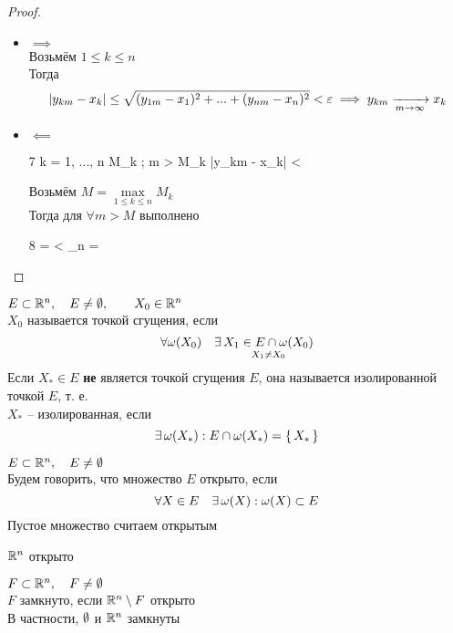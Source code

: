 \begin{proof}
	\hfill
	\begin{itemize}
		\item $ \implies $ \\
		Возьмём $ 1 \le k \le n $ \\
		Тогда
		$$ |y_{km} - x_k | \le \sqrt{(y_{1m} - x_1)^2 + ... + (y_{nm} - x_n)^2} < \varepsilon \implies y_{km} \xrightarrow[m \to \infty]{} x_k $$
		\item $ \impliedby $
		\begin{equ}7
			\forall k = 1, ..., n \quad \exist M_k ; \forall m > M_k \quad |y_{km} - x_k| < \frac{}
		\end{equ}
		Возьмём $ M = \max\limits_{1 \le k \le n} M_k $ \\
		Тогда для $ \forall m > M $ выполнено \eref7
		\begin{equ}8
			 =  < _{n } = \veps
		\end{equ}
	\end{itemize}
\end{proof}

\begin{definition}
	$ E \subset \mathbb{R}^n, \quad E \ne \emptyset, \qquad X_0 \in \mathbb{R}^n $ \\
	$ X_0 $ называется точкой сгущения, если
	$$ \forall \omega(X_0) \quad \exists\, \underset{X_1 \ne X_0}{X_1 \in E \cap \omega(X_0)} $$
	Если $ X_* \in E $ \textbf{не} является точкой сгущения $ E $, она называется изолированной точкой $ E $, т. е. \\
	$ X_* $ -- изолированная, если
	$$ \exists\, \omega(X_*) : E \cap \omega(X_*) = \set{X_*} $$
\end{definition}

\begin{definition}
	$ E \subset \mathbb{R}^n, \quad E \ne \emptyset $ \\
	Будем говорить, что множество $ E $ открыто, если
	$$ \forall X \in E \quad \exists\, \omega(X) : \omega(X) \subset E $$
	Пустое множество считаем открытым
\end{definition}

\begin{intuition}
	$ \mathbb{R}^n $ открыто
\end{intuition}

\begin{definition}
	$ F \subset \mathbb{R}^n, \quad F \ne \emptyset $ \\
	$ F $ замкнуто, если $ \mathbb{R}^n \setminus F $ открыто \\
	В частности, $ \emptyset $ и $ \mathbb{R}^n $ замкнуты
\end{definition}

